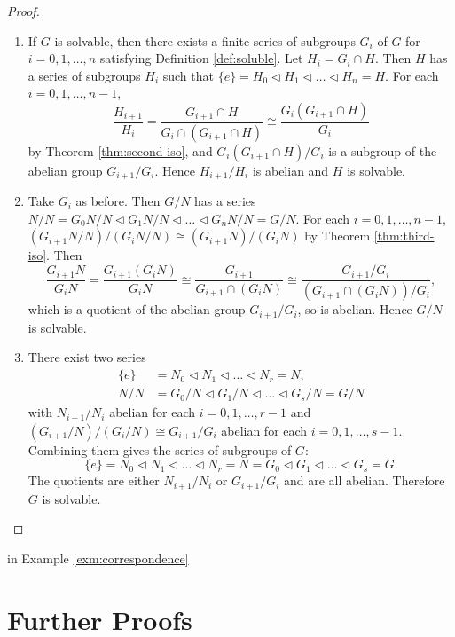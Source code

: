 \begin{proof}
	\begin{enumerate}
		\item If $G$ is solvable, then there exists a finite series of subgroups $G_i$ of $G$ for $i = 0, 1, \dots, n$ satisfying Definition \ref{def:soluble}. Let $H_i = G_i \cap H$. Then $H$ has a series of subgroups $H_i$ such that $\{ e \} = H_0 \triangleleft H_1 \triangleleft \dots \triangleleft H_n = H.$
		For each $i = 0, 1, \dots, n - 1$, 
		$$
		\frac{H_{i+1}}{H_i} 
		= \frac{G_{i+1} \cap H}{G_i \cap (G_{i+1} \cap H)}
		\cong \frac{G_i(G_{i+1} \cap H)} {G_i}
		$$
		by Theorem \ref{thm:second-iso}, and ${G_i(G_{i+1} \cap H)}/{G_i}$ is a subgroup of the abelian group $G_{i+1} / G_{i}$. Hence $H_{i+1} / H_{i}$ is abelian and $H$ is solvable.
		\item Take $G_i$ as before. Then $G / N$ has a series
		$N/N = G_0 N / N \triangleleft G_1 N / N \triangleleft \dots \triangleleft G_n N / N  =  G / N. $
		For each $i = 0, 1, \dots, n - 1$, 
		$(G_{i+1} N / N) / (G_{i} N / N) \cong (G_{i+1} N) / (G_i N)$
		by Theorem \ref{thm:third-iso}. Then 
		$$
		\frac{G_{i+1} N}{G_i N} =\frac{G_{i+1}\left(G_i N\right)}{G_i N} \cong \frac{G_{i+1}}{G_{i+1} \cap\left(G_i N\right)} \cong \frac{G_{i+1} / G_i}{\left(G_{i+1} \cap\left(G_i N\right)\right) / G_i},
		$$
		which is a quotient of the abelian group $G_{i+1} / G_i$, so is abelian. Hence $G / N$ is solvable.
		\item There exist two series
		$$
		\begin{aligned}
			\{ e \} & =N_0 \triangleleft N_1 \triangleleft \ldots \triangleleft N_r=N, \\
			N / N & =G_0 / N \triangleleft G_1 / N \triangleleft \ldots \triangleleft G_s / N=G / N
		\end{aligned}
		$$
		with $N_{i+1} / N_{i}$ abelian for each $i = 0, 1, \dots, r-1$ and $(G_{i+1} / N)  / (G_{i} / N) \cong G_{i+1} / G_i $ abelian for each $i = 0,1, \dots, s-1$. Combining them gives the series of subgroups of $G$:
		$$
		\{ e \}=N_0 \triangleleft N_1 \triangleleft \ldots \triangleleft N_r=N=G_0 \triangleleft G_1 \triangleleft \ldots \triangleleft G_s=G .
		$$
		The quotients are either $N_{i+1} / N_i$  or $G_{i+1} / G_i$ and are all abelian. Therefore $G$ is solvable.
	\end{enumerate}
\end{proof}
in Example \ref{exm:correspondence}

\section{Further Proofs} 

